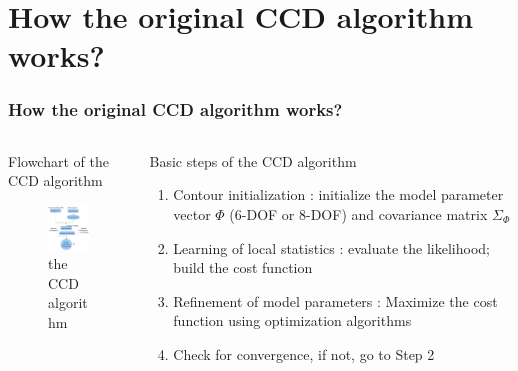 \documentclass[english,10pt,presentation]{beamer}
\begin{document}
\section{How the original CCD algorithm works?}
\label{sec-2}
\begin{frame}
\frametitle{How the original CCD algorithm works?}
\label{sec-2_1}
\begin{columns}
\begin{column}{0.4\textwidth}
\begin{exampleblock}{Flowchart of the CCD algorithm}
\label{sec-2_1_1}

   \begin{figure}[htb]
   \centering
   \includegraphics[width=4cm,angle=0]{./flowchart.jpg}
   \caption{\label{fig: flowchart}the CCD algorithm}
   \end{figure}
\end{exampleblock}
\end{column}
\begin{column}{0.6\textwidth}
\begin{exampleblock}{Basic steps of the CCD algorithm}
\label{sec-2_1_2}

\begin{enumerate}
\item <1-> Contour initialization : initialize the model parameter vector
$\Phi$ (6-DOF or 8-DOF) and covariance matrix $\Sigma_{\Phi}$
\item <2-> Learning of local statistics : evaluate the likelihood; build
the cost function 
\item <3-> Refinement of model parameters : Maximize the cost function
using optimization algorithms
\item <4-> Check for convergence, if not, go to Step 2
\end{enumerate}
\end{exampleblock}
\end{column}
\end{columns}
\end{frame}
\end{document}
